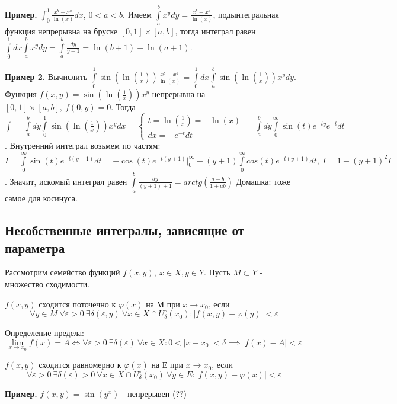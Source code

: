 \textbf{Пример.} $\int_{0}^{1} \frac{x^b-x^a}{\ln(x)}dx$, $0<a<b$.  
Имеем $\int\limits_{a}^{b} x^ydy=\frac{x^b-x^a}{\ln(x)}$, 
подынтегральная функция непрерывна на бруске $[0,1]\times[a,b]$, 
тогда интеграл равен $\int\limits_{0}^{1}dx\int\limits_{a}^{b}x^ydy=
\int\limits_{a}^{b}\frac{dy}{y+1}=\ln(b+1)-\ln(a+1)$.

\textbf{Пример 2.} Вычислить $\int\limits_{0}^{1}\sin(\ln(\frac{1}{x}))
\frac{x^b-x^a}{\ln(x)}=\int\limits_{0}^{1}dx \int\limits_{a}^{b}
\sin(\ln(\frac{1}{x}))x^ydy$. Функция $f(x,y)=\sin(\ln(\frac{1}{x}))x^y$ 
непрерывна на $[0,1]\times[a,b],~f(0,y)=0$. Тогда
$\int=\int\limits_{a}^{b}dy \int\limits_{0}^{1}\sin(\ln(\frac{1}{x}))x^ydx=
\begin{cases} t=\ln(\frac{1}{x})=-\ln(x)\\dx=-e^{-t}dt\end{cases}= 
\int\limits_{a}^{b} dy \int\limits_{0}^{\infty} \sin(t)e^{-ty}e^{-t}dt$. 
Внутренний интеграл возьмем по частям: $I=\int\limits_{0}^{\infty}
\sin(t)e^{-t(y+1)}dt=-\cos(t)e^{-t(y+1)}\big|_0^\infty
-(y+1)\int\limits_{0}^{\infty}cos(t)e^{-t(y+1)}dt,~I=1-(y+1)^2I$.
Значит, искомый интеграл равен 
$\int\limits_{a}^{b}\frac{dy}{(y+1)+1}=arctg\left( \frac{a-b}{1+ab}\right) $
Домашка: тоже самое для косинуса.
\subsection{Несобственные интегралы, зависящие от параметра}
Рассмотрим семейство функций $f(x,y),~x\in X,y\in Y$. Пусть
$M\subset Y$ - множество сходимости.
\begin{defin}
$f(x,y)$ сходится поточечно к  $\varphi(x)$ на М при $x\to x_0$, если
 $$\forall y\in M~\forall \varepsilon>0~\exists \delta(\varepsilon,y)~
 \forall x\in X\cap U^\circ_\delta(x_0):
 |f(x,y)-\varphi(y)|<\varepsilon$$
\end{defin}
Определение предела: 
$$\lim\limits_{x\to x_0}f(x)=A\iff \forall \varepsilon>0~\exists 
\delta(\varepsilon)~\forall x\in X:0<|x-x_0|<\delta\implies|f(x)-A|
<\varepsilon$$
\begin{defin}
$f(x,y)$ сходится равномерно к $\varphi(x)$ на Е при $x\to x_0$, если
$$\forall \varepsilon>0~\exists \delta(\varepsilon)>0~\forall x\in X\cap
U^\circ_\delta(x_0)~\forall y\in E:|f(x,y)-\varphi(x)|<\varepsilon$$
\end{defin}

\textbf{Пример.} $f(x,y)=\sin(y^x)$ - непрерывен (??)

